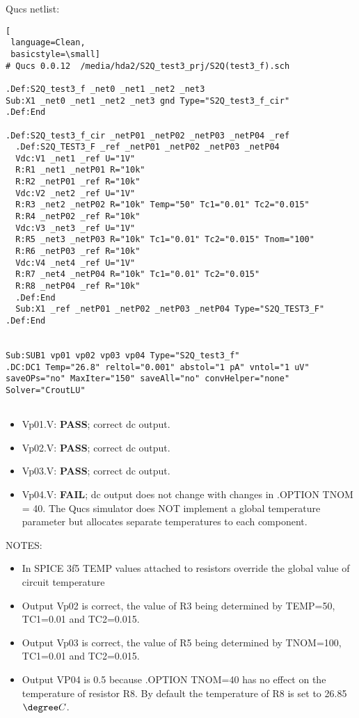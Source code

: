 \newpage 
Qucs netlist:
\begin{lstlisting}[
 language=Clean, 
 basicstyle=\small]
# Qucs 0.0.12  /media/hda2/S2Q_test3_prj/S2Q(test3_f).sch

.Def:S2Q_test3_f _net0 _net1 _net2 _net3
Sub:X1 _net0 _net1 _net2 _net3 gnd Type="S2Q_test3_f_cir"
.Def:End

.Def:S2Q_test3_f_cir _netP01 _netP02 _netP03 _netP04 _ref
  .Def:S2Q_TEST3_F _ref _netP01 _netP02 _netP03 _netP04
  Vdc:V1 _net1 _ref U="1V"
  R:R1 _net1 _netP01 R="10k"
  R:R2 _netP01 _ref R="10k"
  Vdc:V2 _net2 _ref U="1V"
  R:R3 _net2 _netP02 R="10k" Temp="50" Tc1="0.01" Tc2="0.015"
  R:R4 _netP02 _ref R="10k"
  Vdc:V3 _net3 _ref U="1V"
  R:R5 _net3 _netP03 R="10k" Tc1="0.01" Tc2="0.015" Tnom="100"
  R:R6 _netP03 _ref R="10k"
  Vdc:V4 _net4 _ref U="1V"
  R:R7 _net4 _netP04 R="10k" Tc1="0.01" Tc2="0.015"
  R:R8 _netP04 _ref R="10k"
  .Def:End
  Sub:X1 _ref _netP01 _netP02 _netP03 _netP04 Type="S2Q_TEST3_F"
.Def:End


Sub:SUB1 vp01 vp02 vp03 vp04 Type="S2Q_test3_f"
.DC:DC1 Temp="26.8" reltol="0.001" abstol="1 pA" vntol="1 uV" 
saveOPs="no" MaxIter="150" saveAll="no" convHelper="none" Solver="CroutLU"


\end{lstlisting}

\begin{flushleft}

\begin{itemize}
 \item Vp01.V: \textbf{PASS}; correct dc output.
 \item Vp02.V: \textbf{PASS}; correct dc output.
 \item Vp03.V: \textbf{PASS}; correct dc output.
 \item Vp04.V: \textbf{FAIL}; dc output does not change with changes in .OPTION TNOM = 40. The Qucs simulator does NOT implement a global temperature parameter but allocates separate temperatures to each component.
\end{itemize}
\vspace{5mm}
NOTES: \begin{itemize}
\item In SPICE 3f5 TEMP values attached to resistors override the global value of circuit temperature
\item Output Vp02 is correct, the value of R3 being determined by TEMP=50, TC1=0.01 and TC2=0.015. 
\item Output Vp03 is correct, the value of R5 being determined by TNOM=100, TC1=0.01 and TC2=0.015.
\item Output VP04 is 0.5 because .OPTION TNOM=40 has no effect on the temperature of resistor R8. By default the temperature of R8 is set to 26.85$\degree C$. 

                                  \end{itemize}

\end{flushleft}

